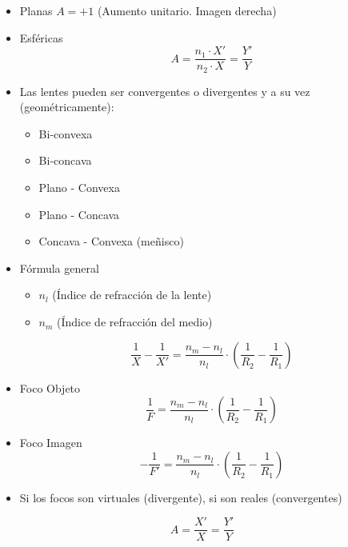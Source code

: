 \begin{itemize}
    \item Planas $A = +1$ (Aumento unitario. Imagen derecha)
    \item Esféricas
    \begin{equation}
        A = \frac{n_1 \cdot X'}{n_2 \cdot X} = \frac{Y'}{Y}
    \end{equation}
\end{itemize}

\begin{itemize}
    \item Las lentes pueden ser convergentes o divergentes y a su vez (geométricamente):
    \begin{itemize}
        \item Bi-convexa
        \item Bi-concava
        \item Plano - Convexa
        \item Plano - Concava
        \item Concava - Convexa (meñisco)
    \end{itemize}
    \item Fórmula general
    \begin{itemize}
        \item $n_l$ (Índice de refracción de la lente)
        \item $n_m$ (Índice de refracción del medio)
    \end{itemize}
    \begin{equation}
        \frac{1}{X} - \frac{1}{X'} = \frac{n_m - n_l}{n_l} \cdot \left( \frac{1}{R_2} - \frac{1}{R_1}\right)
    \end{equation}
    \item Foco Objeto
    \begin{equation}
       \frac{1}{F} = \frac{n_m - n_l}{n_l} \cdot \left( \frac{1}{R_2} - \frac{1}{R_1}\right)
    \end{equation}
    \item Foco Imagen
    \begin{equation}
       -\frac{1}{F'} = \frac{n_m - n_l}{n_l} \cdot \left( \frac{1}{R_2} - \frac{1}{R_1}\right)
    \end{equation}
    \item Si los focos son virtuales (divergente), si son reales (convergentes)
\end{itemize}

\begin{equation}
    A = \frac{X'}{X} = \frac{Y'}{Y}
\end{equation}

